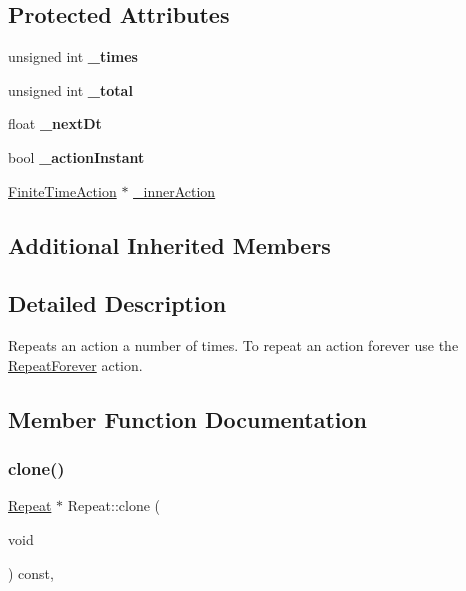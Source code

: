 \subsection*{Protected Attributes}
\begin{DoxyCompactItemize}
\item 
\mbox{\label{classRepeat_a4dd7facd1b30e85dcab9186e8ce0457d}} 
unsigned int {\bfseries \+\_\+times}
\item 
\mbox{\label{classRepeat_a0dd5f94450db963e4ecff432a5c705e4}} 
unsigned int {\bfseries \+\_\+total}
\item 
\mbox{\label{classRepeat_aa0537b23212af69ad6eb6a5160056735}} 
float {\bfseries \+\_\+next\+Dt}
\item 
\mbox{\label{classRepeat_a59a62a1ad455ba80e4a4af886dcb9cc0}} 
bool {\bfseries \+\_\+action\+Instant}
\item 
\hyperlink{classFiniteTimeAction}{Finite\+Time\+Action} $\ast$ \hyperlink{classRepeat_ad0a3e5adaaf1f5dfb67336892e4a0219}{\+\_\+inner\+Action}
\end{DoxyCompactItemize}
\subsection*{Additional Inherited Members}


\subsection{Detailed Description}
Repeats an action a number of times. To repeat an action forever use the \hyperlink{classRepeatForever}{Repeat\+Forever} action. 

\subsection{Member Function Documentation}
\mbox{\label{classRepeat_a758165a1dbeecf9ae2a9027da17bd115}} 
\subsubsection{\texorpdfstring{clone()}{clone()}\hspace{0.1cm}{\footnotesize\ttfamily [1/2]}}
{\footnotesize\ttfamily \hyperlink{classRepeat}{Repeat} $\ast$ Repeat\+::clone (\begin{DoxyParamCaption}\item[{void}]{ }\end{DoxyParamCaption}) const\hspace{0.3cm}{\ttfamily [override]}, {\ttfamily [virtual]}}

